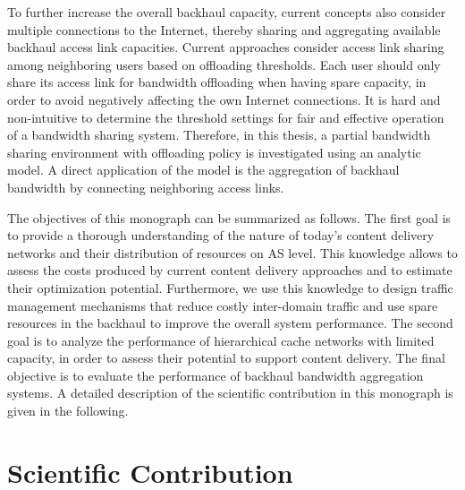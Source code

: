 To further increase the overall backhaul capacity, current concepts also consider multiple connections to the Internet, thereby sharing and aggregating available backhaul access link capacities.
Current approaches consider access link sharing among neighboring users based on offloading thresholds.
Each user should only share its access link for bandwidth offloading when having spare capacity, in order to avoid negatively affecting the own Internet connections.
It is hard and non-intuitive to determine the threshold settings for fair and effective operation of a bandwidth sharing system.
Therefore, in this thesis, a partial bandwidth sharing environment with offloading policy is investigated using an analytic model.
A direct application of the model is the aggregation of backhaul bandwidth by connecting neighboring access links.

The objectives of this monograph can be summarized as follows.
The first goal is to provide a thorough understanding of the nature of today's content delivery networks and their distribution of resources on AS level.
This knowledge allows to assess the costs produced by current content delivery approaches and to estimate their optimization potential.
Furthermore, we use this knowledge to design traffic management mechanisms that reduce costly inter-domain traffic and use spare resources in the backhaul to improve the overall system performance.
The second goal is to analyze the performance of hierarchical cache networks with limited capacity, in order to assess their potential to support content delivery.
The final objective is to evaluate the performance of backhaul bandwidth aggregation systems.
A detailed description of the scientific contribution in this monograph is given in the following.


\newpage
\section{Scientific Contribution}\label{sec:introduction:scientific_contribution}

